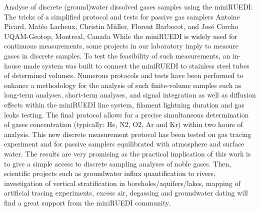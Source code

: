 \begin{conf-abstract}
{Analyse of discrete (ground)water dissolved gases samples using the miniRUEDI: The tricks of a simplified protocol and tests for passive gas samplers}
{Antoine Picard, Matéo Lacheux, Christin Müller, Florent Barbecot, and José Corcho}
{UQAM-Geotop, Montreal, Canada}
{While the miniRUEDI is widely used for continuous measurements, some projects in our laboratory imply to measure gases in discrete samples. To test the feasibility of such measurements, an in-house made system was built to connect the miniRUEDI to stainless steel tubes of determined volumes. Numerous protocols and tests have been performed to enhance a methodology for the analysis of such finite-volume samples such as long-term analyses, short-term analyses, and signal integration as well as diffusion effects within the miniRUEDI line system, filament lightning duration and gas leaks testing. The final protocol allows for a precise simultaneous determination of gases concentration (typically: He, N2, O2, Ar and Kr) within two hours of analysis. This new discrete measurement protocol has been tested on gas tracing experiment and for passive samplers equilibrated with atmosphere and surface water. The results are very promising as the practical implication of this work is to give a simple access to discrete sampling analyses of noble gases. Then, scientific projects such as groundwater influx quantification to rivers, investigation of vertical stratification in boreholes/aquifers/lakes, mapping of artificial tracing experiments, excess air, degassing and groundwater dating will find a great support from the miniRUEDI community.}
\end{conf-abstract}
